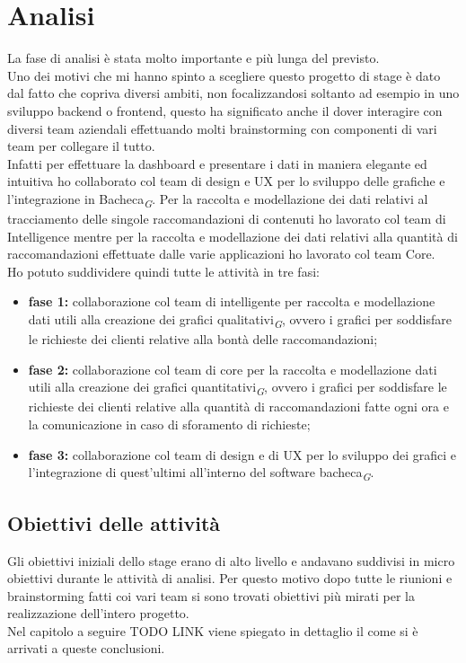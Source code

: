 \documentclass[a4paper, 12pt, twoside, openright]{book}
\newcommand{\gloss}[1]{#1\textsubscript{\textit{\tiny{G}}}}
\begin{document}
\section{Analisi}
La fase di analisi è stata molto importante e più lunga del previsto.\\
Uno dei motivi che mi hanno spinto a scegliere questo progetto di stage è dato dal fatto che copriva diversi ambiti, non focalizzandosi soltanto ad esempio in uno sviluppo backend o frontend, questo ha significato anche il dover interagire con diversi team aziendali effettuando molti brainstorming con componenti di vari team per collegare il tutto.\\
Infatti per effettuare la dashboard e presentare i dati in maniera elegante ed intuitiva ho collaborato col team di design e UX per lo sviluppo delle grafiche e l'integrazione in \gloss{Bacheca}. Per la raccolta e modellazione  dei dati relativi al tracciamento delle singole raccomandazioni di contenuti ho lavorato col team di Intelligence mentre per la raccolta e modellazione dei dati relativi alla quantità di raccomandazioni effettuate dalle varie applicazioni ho lavorato col team Core.\\
Ho potuto suddividere quindi tutte le attività in tre fasi:
\begin{itemize}
\item \textbf{fase 1:} collaborazione col team di intelligente per raccolta e modellazione dati utili alla creazione dei \gloss{grafici qualitativi}, ovvero i grafici per soddisfare le richieste dei clienti relative alla bontà delle raccomandazioni;
\item \textbf{fase 2:} collaborazione col team di core per la raccolta e modellazione dati utili alla creazione dei \gloss{grafici quantitativi}, ovvero i grafici per soddisfare le richieste dei clienti relative alla quantità di raccomandazioni fatte ogni ora e la comunicazione in caso di sforamento di richieste;
\item \textbf{fase 3:} collaborazione col team di design e di UX per lo sviluppo dei grafici e l'integrazione di quest'ultimi all'interno del software \gloss{bacheca}.
\end{itemize}

\subsection{Obiettivi delle attività}
Gli obiettivi iniziali dello stage erano di alto livello e andavano suddivisi in micro obiettivi durante le attività di analisi. Per questo motivo dopo tutte le riunioni e brainstorming fatti coi vari team si sono trovati obiettivi più mirati per la realizzazione dell'intero progetto.\\
Nel capitolo a seguire TODO LINK viene spiegato in dettaglio il come si è arrivati a queste conclusioni.
\end{document}
